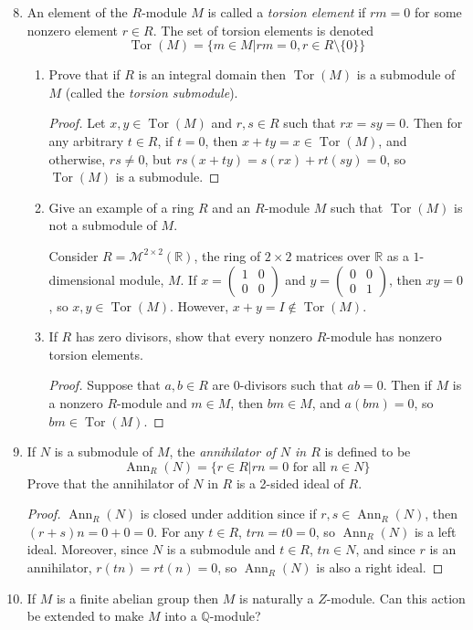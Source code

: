 \documentclass{report}
\newcommand{\Q}{\mathbb{Q}}
\newcommand{\R}{\mathbb{R}}
\DeclareMathOperator{\Tor}{Tor}
\DeclareMathOperator{\An}{Ann}
\begin{document}
\begin{enumerate}
		\setcounter{enumi}{7}
	\item An element of the $R$-module $M$ is called a \textit{torsion element} if $rm=0$ for some nonzero element $r \in R$. The set of torsion elements is denoted
		$$\Tor(M)=\{m\in M | rm=0, r\in R\setminus \{0\}\}$$
		
	\begin{enumerate} [label=(\alph*)]
		\item Prove that if $R$ is an integral domain then $\Tor(M)$ is a submodule of $M$ (called the \textit{torsion submodule}). 
			\begin{proof}
				Let $x,y \in \Tor(M)$ and $r,s\in R$ such that $rx=sy=0$. Then for any arbitrary $t\in R$, if $t=0$, then $x+ty=x\in \Tor(M)$, and otherwise, $rs\neq 0$, but $rs(x+ty)=s(rx)+rt(sy)=0$, so $\Tor(M)$ is a submodule.
			\end{proof}
		\item Give an example of a ring $R$ and an $R$-module $M$ such that $\Tor(M)$ is not a submodule of $M$.
			\newline

			Consider $R=\mathcal{M}^{2\times 2}(\R)$, the ring of $2\times 2$ matrices over $\R$ as a $1$-dimensional module, $M$.
			If $x=\begin{pmatrix}1&0\\0&0\end{pmatrix}$ and $y=\begin{pmatrix}0&0\\0&1\end{pmatrix}$, then $xy=0$, so $x,y\in \Tor(M)$. However, $x+y=I\notin\Tor(M)$.
		\item If $R$ has zero divisors, show that every nonzero $R$-module has nonzero torsion elements. 
			\begin{proof}
				Suppose that $a,b\in R$ are $0$-divisors such that $ab=0$. Then if $M$ is a nonzero $R$-module and $m\in M$, then $bm\in M$, and $a(bm)=0$, so $bm\in\Tor(M)$.
			\end{proof}
	\end{enumerate}
	\item If $N$ is a submodule of $M$, the \textit{annihilator of $N$ in $R$} is defined to be 
		$$\An_R(N)=\{r\in R |rn=0 \text{ for all }n \in N\}$$
		Prove that the annihilator of $N$ in $R$ is a 2-sided ideal of $R$.
		\begin{proof}
			$\An_R(N)$ is closed under addition since if $r,s\in \An_R(N)$, then $(r+s)n=0+0=0$.
			For any $t\in R$, $trn=t0=0$, so $\An_R(N)$ is a left ideal. Moreover, since $N$ is a submodule and $t\in R$, $tn\in N$, and since $r$ is an annihilator, $r(tn)=rt(n)=0$, so $\An_R(N)$ is also a right ideal.
		\end{proof}
	\setcounter{enumi}{14}
	\item If $M$ is a finite abelian group then $M$ is naturally a $Z$-module. Can this action be extended to make $M$ into a $\Q$-module?
		\newline
		

\end{enumerate}
\end{document}
